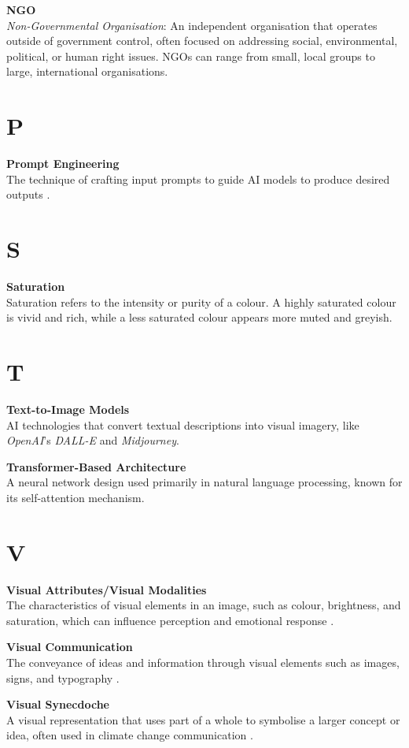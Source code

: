 \vspace{3mm}

\noindent \textbf{NGO}\\
\noindent \textit{Non-Governmental Organisation}: An independent organisation that operates outside of government control, often focused on addressing social, environmental, political, or human right issues. NGOs can range from small, local groups to large, international organisations.

\section*{P}
\noindent \textbf{Prompt Engineering}\\
\noindent The technique of crafting input prompts to guide AI models to produce desired outputs \parencite{Liu2022}.

\section*{S}
\noindent \textbf{Saturation}\\
\noindent Saturation refers to the intensity or purity of a colour. A highly saturated colour is vivid and rich, while a less saturated colour appears more muted and greyish.

\section*{T}
\noindent \textbf{Text-to-Image Models}\\
\noindent AI technologies that convert textual descriptions into visual imagery, like \textit{OpenAI}'s \textit{DALL-E} and \textit{Midjourney}.

\vspace{3mm}

\noindent \textbf{Transformer-Based Architecture}\\
\noindent A neural network design used primarily in natural language processing, known for its self-attention mechanism.

\section*{V}
\noindent \textbf{Visual Attributes/Visual Modalities}\\
\noindent The characteristics of visual elements in an image, such as colour, brightness, and saturation, which can influence perception and emotional response \parencite{Kress2020}.

\vspace{3mm}

\noindent \textbf{Visual Communication}\\
\noindent The conveyance of ideas and information through visual elements such as images, signs, and typography \parencite{Smith2004}.

\vspace{3mm}

\noindent \textbf{Visual Synecdoche}\\
\noindent A visual representation that uses part of a whole to symbolise a larger concept or idea, often used in climate change communication \parencite{ONeill2019}.
